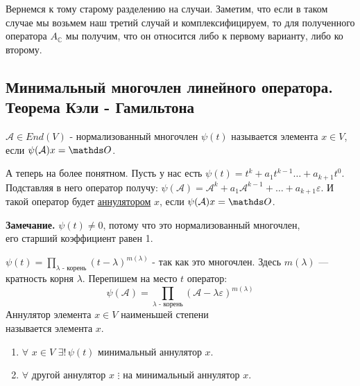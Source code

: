 Вернемся к тому старому разделению на случаи. Заметим, что если в таком случае мы возьмем наш третий случай и комплексифицируем, то для полученного оператора $A_{\mathbb{C}}$ мы получим, что он относится либо к первому варианту, либо ко второму.

\subsection{Минимальный многочлен линейного оператора. Теорема Кэли - Гамильтона}

 $\mathcal{A}\in End(V)$ - нормализованный многочлен $\psi(t)$ называется  элемента $x \in V$, если $\psi(\mathcal{A}) x = \zero$.

А теперь на более понятном. Пусть у нас есть  $\psi(t) = t^k +a_1t^{k-1} \ldots +a_{k+1}t^0$. Подставляя в него оператор получу: $\psi(\mathcal{A}) = \mathcal{A}^k +a_1\mathcal{A}^{k-1}+\ldots + a_{k+1}\varepsilon$. И такой оператор будет \uline{аннулятором} $x$, если $\psi(\mathcal{A})x = \zero$.

\textbf{Замечание.} $\psi(t) \neq 0$, потому что это нормализованный многочлен, \\ его старший коэффициент равен 1.

$\psi(t) = \prod\limits_{\lambda \text{ - корень}}(t-\lambda)^{m(\lambda)}$ -  так как это многочлен. Здесь $m(\lambda)$ --- кратность корня $\lambda$. Перепишем на место $t$ оператор:
$$\psi(\mathcal{A} ) = \prod\limits_{\lambda \text{ - корень} }(\mathcal{A} -\lambda  \varepsilon)^{m(\lambda)}$$
 Аннулятор элемента $x\in V$ наименьшей степени \\ называется  элемента $x$.

\begin{enumerate}
    \item $\forall $ $x \in V $ $ \exists! \, \psi(t)$ минимальный аннулятор $x$.
    \item $\forall$ другой аннулятор $x$  $\vdots$ на минимальный аннулятор $x$.
\end{enumerate}

